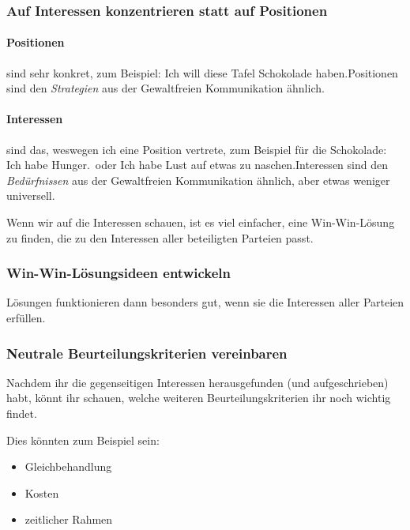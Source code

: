 \subsubsection{Auf Interessen konzentrieren statt auf Positionen}

\paragraph{Positionen} sind sehr konkret, zum Beispiel: \glqq Ich will diese Tafel Schokolade haben.\grqq Positionen sind den \emph{Strategien} aus der Gewaltfreien Kommunikation ähnlich.

\paragraph{Interessen} sind das, weswegen ich eine Position vertrete, zum Beispiel für die Schokolade: \glqq Ich habe Hunger.\grqq\ oder \glqq Ich habe Lust auf etwas zu naschen.\grqq Interessen sind den \emph{Bedürfnissen} aus der Gewaltfreien Kommunikation ähnlich, aber etwas weniger universell.

Wenn wir auf die Interessen schauen, ist es viel einfacher, eine Win-Win-Lösung zu finden, die zu den Interessen aller beteiligten Parteien passt.


\subsubsection{Win-Win-Lösungsideen entwickeln}

Lösungen funktionieren dann besonders gut, wenn sie die Interessen aller Parteien erfüllen.


\subsubsection{Neutrale Beurteilungskriterien vereinbaren}

Nachdem ihr die gegenseitigen Interessen herausgefunden (und aufgeschrieben) habt, könnt ihr schauen, welche weiteren Beurteilungskriterien ihr noch wichtig findet.

Dies könnten zum Beispiel sein:

\begin{itemize}
  \item Gleichbehandlung
  \item Kosten
  \item zeitlicher Rahmen
\end{itemize}


